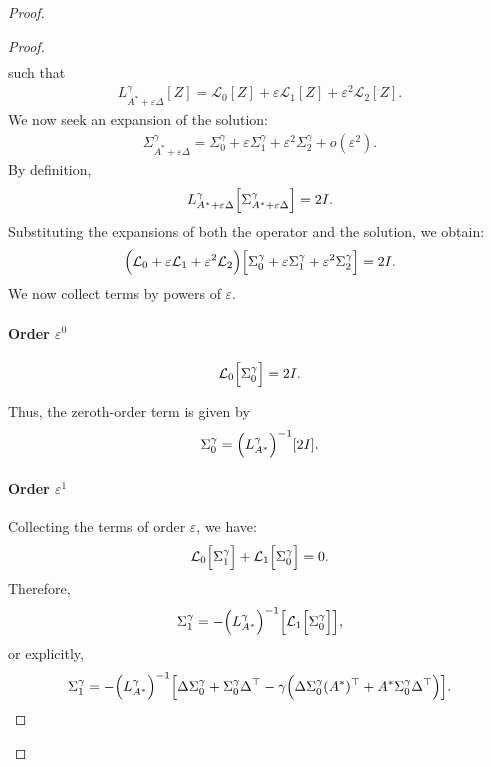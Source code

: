 \documentclass[11pt]{article}
\begin{document}
\begin{proof}
\begin{proof}
\begin{align*}
 \end{align*}
such that
 \begin{align*}
L^\gamma_{A^*+\varepsilon\Delta}[Z] = \mathcal{L}_0[Z] + \varepsilon  \mathcal{L}_1[Z] + \varepsilon^2  \mathcal{L}_2[Z].
 \end{align*}
We now seek an expansion of the solution:
 \begin{align*}
\Sigma^\gamma_{A^*+\varepsilon\Delta} = \Sigma_0^\gamma + \varepsilon  \Sigma_1^\gamma + \varepsilon^2  \Sigma_2^\gamma + o(\varepsilon^2).
 \end{align*}
By definition,
 \begin{align*}
L^\gamma_{A^*+\varepsilon\Delta}\Bigl[\Sigma^\gamma_{A^*+\varepsilon\Delta}\Bigr] = 2I.
 \end{align*}
Substituting the expansions of both the operator and the solution, we obtain:
 \begin{align*}
\Bigl(\mathcal{L}_0 + \varepsilon  \mathcal{L}_1 + \varepsilon^2  \mathcal{L}_2\Bigr)
\Bigl[\Sigma_0^\gamma + \varepsilon  \Sigma_1^\gamma + \varepsilon^2  \Sigma_2^\gamma\Bigr] = 2I.
 \end{align*}
We now collect terms by powers of $\varepsilon$.

\paragraph{Order \(\varepsilon^0\)}
 \begin{align*}
\mathcal{L}_0\Bigl[\Sigma_0^\gamma\Bigr] = 2I.
 \end{align*}

Thus, the zeroth-order term is given by
 \begin{align*}
\Sigma_0^\gamma = \Bigl(L^\gamma_{A^*}\Bigr)^{-1}[2I].
 \end{align*}

\paragraph{Order \(\varepsilon^1\)}
Collecting the terms of order $\varepsilon$, we have:
 \begin{align*}
\mathcal{L}_0\Bigl[\Sigma_1^\gamma\Bigr] + \mathcal{L}_1\Bigl[\Sigma_0^\gamma\Bigr] = 0.
 \end{align*}
Therefore,
 \begin{align*}
\Sigma_1^\gamma = -\Bigl(L^\gamma_{A^*}\Bigr)^{-1}\Bigl[\mathcal{L}_1\Bigl[\Sigma_0^\gamma\Bigr]\Bigr],
 \end{align*}
or explicitly,
 \begin{align*}
\Sigma_1^\gamma = -\Bigl(L^\gamma_{A^*}\Bigr)^{-1}\Bigl[
  \Delta  \Sigma_0^\gamma + \Sigma_0^\gamma  \Delta^\top - \gamma\Bigl(\Delta  \Sigma_0^\gamma  (A^*)^\top + A^*  \Sigma_0^\gamma  \Delta^\top\Bigr)
\Bigr].
 \end{align*}


\end{proof}
\end{proof}
\end{document}
